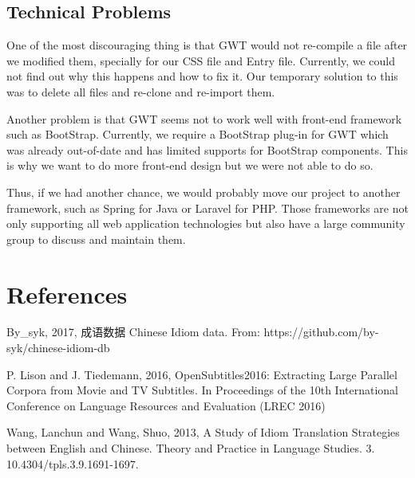 \documentclass[11pt]{article} %
\begin{document}
\subsection{Technical Problems}
\indent One of the most discouraging thing is that GWT would not re-compile a file after we modified them, specially for our CSS file and Entry file. Currently, we could not find out why this happens and how to fix it. Our temporary solution to this was to delete all files and re-clone and re-import them.

Another problem is that GWT seems not to work well with front-end framework such as BootStrap. Currently, we require a BootStrap plug-in for GWT which was already out-of-date and has limited supports for BootStrap components. This is why we want to do more front-end design but we were not able to do so.

Thus, if we had another chance, we would probably move our project to another framework, such as Spring for Java or Laravel for PHP. Those frameworks are not only supporting all web application technologies but also have a large community group to discuss and maintain them.



\section{References}

By\_syk, 2017, 成语数据 Chinese Idiom data. From: https://github.com/by-syk/chinese-idiom-db

P. Lison and J. Tiedemann, 2016, OpenSubtitles2016: Extracting Large Parallel Corpora from Movie and TV Subtitles. In Proceedings of the 10th International Conference on Language Resources and Evaluation (LREC 2016)

Wang, Lanchun and Wang, Shuo,  2013, A Study of Idiom Translation Strategies between English and Chinese. Theory and Practice in Language Studies. 3. 10.4304/tpls.3.9.1691-1697. 
\end{document}
